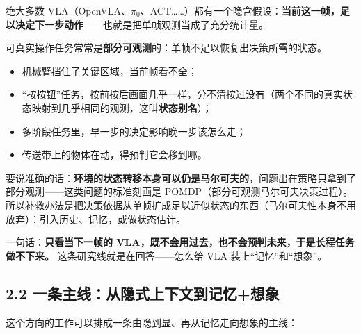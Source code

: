 \documentclass[
  chinese,
]{ctexart}
\providecommand{\tightlist}{%
  \setlength{\itemsep}{0pt}\setlength{\parskip}{0pt}}
\begin{document}
绝大多数
VLA（OpenVLA、\(\pi_0\)、ACT\ldots\ldots）都有一个隐含假设：\textbf{当前这一帧，足以决定下一步动作}------也就是把单帧观测当成了充分统计量。

可真实操作任务常常是\textbf{部分可观测}的：单帧不足以恢复出决策所需的状态。

\begin{itemize}
\tightlist
\item
  机械臂挡住了关键区域，当前帧看不全；
\item
  ``按按钮''任务，按前按后画面几乎一样，分不清按过没有（两个不同的真实状态映射到几乎相同的观测，这叫\textbf{状态别名}）；
\item
  多阶段任务里，早一步的决定影响晚一步该怎么走；
\item
  传送带上的物体在动，得预判它会移到哪。
\end{itemize}

要说准确的话：\textbf{环境的状态转移本身可以仍是马尔可夫的}，问题出在策略只拿到了部分观测------这类问题的标准刻画是
POMDP（部分可观测马尔可夫决策过程）。所以补救办法是把决策依据从单帧扩成足以近似状态的东西（马尔可夫性本身不用放弃）：引入历史、记忆，或做状态估计。

一句话：\textbf{只看当下一帧的
VLA，既不会用过去，也不会预判未来，于是长程任务做不下来。}
这条研究线就是在回答------怎么给 VLA 装上``记忆''和``想象''。

\subsection{2.2
一条主线：从隐式上下文到记忆+想象}\label{ux4e00ux6761ux4e3bux7ebfux4eceux9690ux5f0fux4e0aux4e0bux6587ux5230ux8bb0ux5fc6ux60f3ux8c61}

这个方向的工作可以排成一条由隐到显、再从记忆走向想象的主线：
\end{document}
